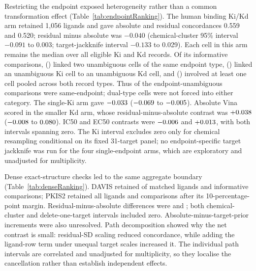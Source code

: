 \documentclass[11pt]{article}
\begin{document}
Restricting the endpoint exposed heterogeneity rather than a common transformation effect
(Table~\ref{tab:endpointRanking}). The human binding Ki/Kd arm retained 1,056 ligands and
gave absolute and residual concordances 0.559 and 0.520; residual minus absolute was
$-0.040$ (chemical-cluster 95\% interval $-0.091$ to 0.003; target-jackknife interval
$-0.133$ to 0.029). Each cell in this arm remains the median over all eligible Ki and Kd
records. Of its \BroadHumanKiKdPairs{} informative comparisons,
\BroadHumanKiKdSameEndpointPairs{} (\BroadHumanKiKdSameEndpointPercent{}) linked two
unambiguous cells of the same endpoint type, \BroadHumanKiKdMixedEndpointPairs{}
(\BroadHumanKiKdMixedEndpointPercent{}) linked an unambiguous Ki cell to an unambiguous Kd
cell, and \BroadHumanKiKdPooledCellPairs{} (\BroadHumanKiKdPooledCellPercent{}) involved at
least one cell pooled across both record types. Thus
\BroadHumanKiKdSameAmongUnambiguousPercent{} of the
\BroadHumanKiKdEndpointUnambiguousPairs{} endpoint-unambiguous comparisons were
same-endpoint; dual-type cells were not forced into either category. The single-Ki arm gave
$-0.033{}$ ($-0.069{}$ to $-0.005{}$).
Absolute Vina scored \BroadSingleKdAbsolute{} in the smaller Kd arm, whose residual-minus-absolute contrast was
$+0.038{}$ ($-0.008{}$ to $0.080{}$). IC50 and EC50
contrasts were $-0.006{}$ and $+0.013{}$, with both
intervals spanning zero. The Ki interval excludes zero only for
chemical resampling conditional on its fixed 31-target panel; no endpoint-specific target
jackknife was run for the four single-endpoint arms, which are exploratory and unadjusted
for multiplicity.

Dense exact-structure checks led to the same aggregate boundary
(Table~\ref{tab:denseRanking}). DAVIS retained \DenseDavisEvaluatedLigands{} of
\DenseDavisMatchedLigands{} matched ligands and \DenseDavisPairs{} informative comparisons;
PKIS2 retained all \DensePkisTwoMatchedLigands{} ligands and \DensePkisTwoPairs{}
comparisons after its 10-percentage-point margin. Residual-minus-absolute differences were
\DenseDavisDelta{} and \DensePkisTwoDelta{}; both chemical-cluster and delete-one-target
intervals included zero. Absolute-minus-target-prior increments were also unresolved.
Path decomposition showed why the net contrast is small: residual-SD scaling reduced
concordance, while adding the ligand-row term under unequal target scales increased it. The
individual path intervals are correlated and unadjusted for multiplicity, so they localise
the cancellation rather than establish independent effects.
\end{document}

